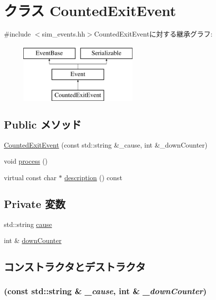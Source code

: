 \hypertarget{classCountedExitEvent}{
\section{クラス CountedExitEvent}
\label{classCountedExitEvent}
}


{\ttfamily \#include $<$sim\_\-events.hh$>$}CountedExitEventに対する継承グラフ:\begin{figure}[H]
\begin{center}
\leavevmode
\includegraphics[height=3cm]{classCountedExitEvent}
\end{center}
\end{figure}
\subsection*{Public メソッド}
\begin{DoxyCompactItemize}
\item 
\hyperlink{classCountedExitEvent_ac78f43e63b44f1005dd9a07788f7121d}{CountedExitEvent} (const std::string \&\_\-cause, int \&\_\-downCounter)
\item 
void \hyperlink{classCountedExitEvent_a2e9c5136d19b1a95fc427e0852deab5c}{process} ()
\item 
virtual const char $\ast$ \hyperlink{classCountedExitEvent_a5a14fe478e2393ff51f02e9b7be27e00}{description} () const 
\end{DoxyCompactItemize}
\subsection*{Private 変数}
\begin{DoxyCompactItemize}
\item 
std::string \hyperlink{classCountedExitEvent_ae4eec0077e30624726ddd2a0947962e5}{cause}
\item 
int \& \hyperlink{classCountedExitEvent_a5b3286721a949c321dee6a7a21f22748}{downCounter}
\end{DoxyCompactItemize}


\subsection{コンストラクタとデストラクタ}
\hypertarget{classCountedExitEvent_ac78f43e63b44f1005dd9a07788f7121d}{
\subsubsection[{CountedExitEvent}]{ (const std::string \& {\em \_\-cause}, \/  int \& {\em \_\-downCounter})}}
\label{classCountedExitEvent_ac78f43e63b44f1005dd9a07788f7121d}



